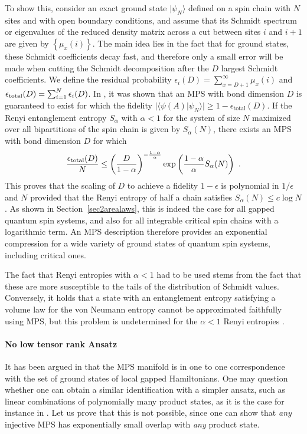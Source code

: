 \documentclass[rmp,aps,reprint,superscriptaddress,nobalancelastpage]{revtex4-1}
\newcommand{\be}{\begin{equation}}
\newcommand{\ee}{\end{equation}}
\begin{document}
To show this, consider an exact ground  state $|\psi_N\rangle$ defined on a spin chain with $N$ sites and with open boundary conditions, and assume that its Schmidt spectrum or eigenvalues of the reduced density matrix across a cut between sites $i$ and $i+1$ are given by $\left\{\mu_x(i)\right\}$. The main idea lies in the fact that for ground states, these Schmidt coefficients decay fast, and therefore only a small error will be made when cutting the Schmidt decomposition after the $D$ largest Schmidt coefficients. We define the residual probability $\epsilon_i(D)=\sum_{x=D+1}^\infty \mu_x(i)$ and $\epsilon_{\rm total}(D)=\sum_{i=1}^N\epsilon_i(D)$. In \citet{verstraete:faithfully}, it was shown that an MPS with bond dimension $D$ is guaranteed to exist for which the fidelity $|\langle\psi(A)|\psi_N\rangle|\geq 1-\epsilon_\mathrm{total}(D)$. If the Renyi entanglement entropy $S_\alpha$ with $\alpha<1$ for the system of size $N$ maximized over all bipartitions of the spin chain is given by $S_\alpha(N)$, there exists an MPS with bond dimension $D$ for which
\be \frac{\epsilon_{\rm total}(D)}{N}\leq \left(\frac{D}{1-\alpha}\right)^{-\frac{1-\alpha}{\alpha}}\exp\left(\frac{1-\alpha}{\alpha}S_\alpha(N)\right)\ . \ee
This proves that the scaling of $D$ to achieve a fidelity $1-\epsilon$ is polynomial in $1/\epsilon$ and $N$ provided that the Renyi entropy of half a chain satisfies $S_\alpha(N)\leq c\log N$. As shown in Section~\ref{sec2arealaws}, this is indeed the case for all gapped quantum spin systems, and also for all integrable critical spin chains with a logarithmic term. An MPS description therefore provides an exponential compression for a wide variety of ground states of quantum spin systems, including critical ones.

The fact that Renyi entropies with $\alpha<1$ had to be used stems from the fact that these are more susceptible to the tails of the distribution of  Schmidt values. Conversely, it holds that a state with an entanglement entropy satisfying a volume law for the von Neumann entropy cannot be approximated faithfully using MPS, but this problem is undetermined for the $\alpha<1$ Renyi entropies \cite{schuch:mps-entropies}.

\paragraph{No low tensor rank Ansatz}

It has been argued in that the MPS manifold is in one to one correspondence with the set of ground states of local gapped Hamiltonians. One may question whether one can obtain a similar identification with a simpler ansatz, such as linear combinations of polynomially many product states, as it is the case for instance in \cite{beylkin2002numerical,hackbusch2012tensor,kolda2009tensor,de2000multilinear}. Let us prove that this is  not possible, since one can show that {\it any} injective MPS has exponentially small overlap with {\it any} product state.
\end{document}
